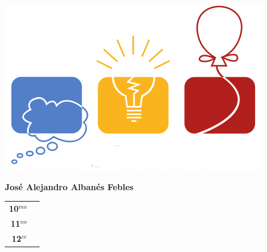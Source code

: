 \begin{minipage}{0.2\textwidth}
	\includegraphics[width=\linewidth]{img/icpc.png} %
\end{minipage}
\hfill
\begin{minipage}{0.7\textwidth}
	\textbf{José Alejandro Albanés Febles }
	
	\vspace*{0.1in}
	\begin{tabular}{rl}
		
		\textbf{10$^{mo}$} &   \\
		
		\textbf{11$^{no}$} &  \\
		
		\textbf{12$^{ce}$} &   \\
		
		
	\end{tabular}
\end{minipage}


